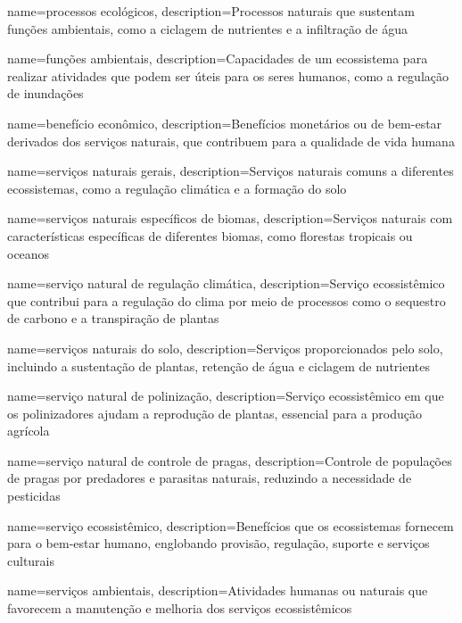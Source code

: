 {
	name=processos ecológicos,
	description={Processos naturais que sustentam funções ambientais, como a ciclagem de nutrientes e a infiltração de água}
}

{
	name=funções ambientais,
	description={Capacidades de um ecossistema para realizar atividades que podem ser úteis para os seres humanos, como a regulação de inundações}
}

{
	name=benefício econômico,
	description={Benefícios monetários ou de bem-estar derivados dos serviços naturais, que contribuem para a qualidade de vida humana}
}

{
	name=serviços naturais gerais,
	description={Serviços naturais comuns a diferentes ecossistemas, como a regulação climática e a formação do solo}
}

{
	name=serviços naturais específicos de biomas,
	description={Serviços naturais com características específicas de diferentes biomas, como florestas tropicais ou oceanos}
}

{
	name=serviço natural de regulação climática,
	description={Serviço ecossistêmico que contribui para a regulação do clima por meio de processos como o sequestro de carbono e a transpiração de plantas}
}

{
	name=serviços naturais do solo,
	description={Serviços proporcionados pelo solo, incluindo a sustentação de plantas, retenção de água e ciclagem de nutrientes}
}

{
	name=serviço natural de polinização,
	description={Serviço ecossistêmico em que os polinizadores ajudam a reprodução de plantas, essencial para a produção agrícola}
}

{
	name=serviço natural de controle de pragas,
	description={Controle de populações de pragas por predadores e parasitas naturais, reduzindo a necessidade de pesticidas}
}

{
	name=serviço ecossistêmico,
	description={Benefícios que os ecossistemas fornecem para o bem-estar humano, englobando provisão, regulação, suporte e serviços culturais}
}

{
	name=serviços ambientais,
	description={Atividades humanas ou naturais que favorecem a manutenção e melhoria dos serviços ecossistêmicos}
}

